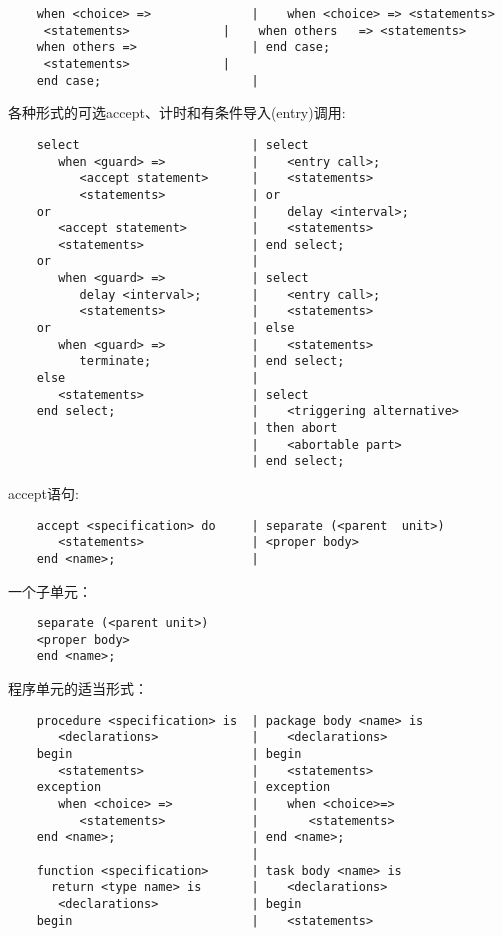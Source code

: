 \begin{blockindent}
\begin{lstlisting}
    when <choice> =>              |    when <choice> => <statements>
	 <statements>             |    when others   => <statements>
    when others =>                | end case;
	 <statements>             |
    end case;                     |
\end{lstlisting}
各种形式的可选accept、计时和有条件导入(entry)调用:
\begin{lstlisting}
    select                        | select
       when <guard> =>            |    <entry call>;
          <accept statement>      |    <statements>
          <statements>            | or
    or                            |    delay <interval>;
       <accept statement>         |    <statements>
       <statements>               | end select;
    or                            |
       when <guard> =>            | select
          delay <interval>;       |    <entry call>;
          <statements>            |    <statements>
    or                            | else
       when <guard> =>            |    <statements>
          terminate;              | end select;
    else                          |
       <statements>               | select
    end select;                   |    <triggering alternative>
                                  | then abort
                                  |    <abortable part>
                                  | end select;
\end{lstlisting}
accept语句:
\begin{lstlisting}
    accept <specification> do     | separate (<parent  unit>)
       <statements>               | <proper body>
    end <name>;                   |
\end{lstlisting}
一个子单元：
\begin{lstlisting}
    separate (<parent unit>)
    <proper body>
    end <name>;
\end{lstlisting}
程序单元的适当形式：
\begin{lstlisting}
    procedure <specification> is  | package body <name> is
       <declarations>             |    <declarations>
    begin                         | begin
       <statements>               |    <statements>
    exception                     | exception
       when <choice> =>           |    when <choice>=>
          <statements>            |       <statements>
    end <name>;                   | end <name>;
                                  |
    function <specification>      | task body <name> is
      return <type name> is       |    <declarations>
       <declarations>             | begin
    begin                         |    <statements>

\end{lstlisting}
\end{blockindent}
